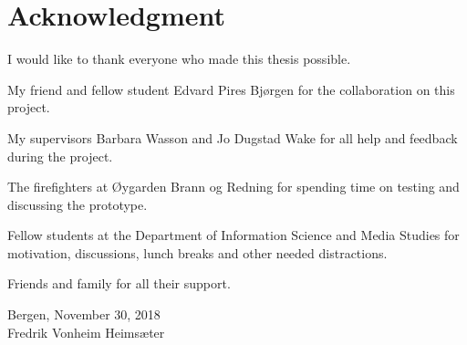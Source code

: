 \documentclass[../Main/thesis.tex]{subfiles}
\begin{document}
\chapter*{Acknowledgment}
I would like to thank everyone who made this thesis possible.

My friend and fellow student Edvard Pires Bjørgen for the collaboration on this project.

My supervisors Barbara Wasson and Jo Dugstad Wake for all help and feedback during the project.

The firefighters at Øygarden Brann og Redning for spending time on testing and discussing the prototype.

Fellow students at the Department of Information Science and Media Studies for motivation, discussions, lunch breaks and other needed distractions.

Friends and family for all their support.

\raggedleft
Bergen, November 30, 2018 \\
Fredrik Vonheim Heimsæter


\blankpage
\end{document}
